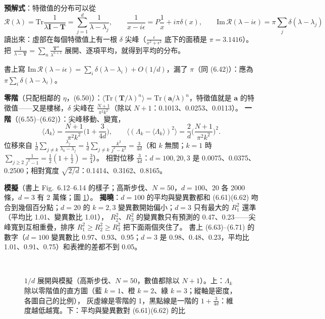 \textbf{預解式}：特徵值的分布可以從
\[\mathcal R(\lambda)=\mathrm{Tr}\frac{1}{\lambda\mathbf I-\mathbf T}=\sum_{j=1}^{d}\frac{1}{\lambda-\lambda_j},\qquad
\frac{1}{x-i\epsilon}=P\frac1x+i\pi\delta(x),\qquad \mathrm{Im}\,\mathcal R(\lambda-i\epsilon)=\pi\sum_j\delta(\lambda-\lambda_j)\tag{6.38--6.42}\]
讀出來：虛部在每個特徵值上有一根 $\delta$ 尖峰（$\frac{\epsilon}{x^2+\epsilon^2}$ 底下的面積是 $\pi=3.1416$）。把 $\frac1{\lambda-\mathbf T}=\sum_n\frac{\mathbf T^n}{\lambda^{n+1}}$ 展開、逐項平均，就得到平均的分布。
\begin{errbox}[p.~146，(6.52)]
書上寫 $\mathrm{Im}\,\mathcal R(\lambda-i\epsilon)=\sum_i\delta(\lambda-\lambda_i)+O(1/d)$，漏了 $\pi$（同 (6.42)）：應為 $\pi\sum_i\delta(\lambda-\lambda_i)$。
\end{errbox}
\textbf{零階}（只配相鄰的 $\eta$，(6.50)）：$\langle\mathrm{Tr}(\mathbf T/\lambda)^n\rangle=\mathrm{Tr}(\mathbf a/\lambda)^n$，特徵值就是 $\mathbf a$ 的特徵值——又是樓梯，$\delta$ 尖峰在
$\frac{N+1}{\pi^2k^2}$（除以 $N+1$：0.1013、0.0253、0.0113）。
\textbf{一階}（(6.55)--(6.62)）：尖峰移動、變寬，
\[\langle\Lambda_k\rangle=\frac{N+1}{\pi^2k^2}\Big(1+\frac{3}{4d}\Big),\qquad \big\langle(\Lambda_k-\langle\Lambda_k\rangle)^2\big\rangle=\frac2d\Big(\frac{N+1}{\pi^2k^2}\Big)^2.\tag{6.61, 6.62}\]
位移來自 $\frac1d\sum_{j\ne k}\frac{\lambda_j}{\lambda_k-\lambda_j}=\frac1d\sum_{j\ne k}\frac{k^2}{j^2-k^2}=\frac{3}{4d}$（和 $k$ 無關；$k=1$ 時 $\sum_{j\ge2}\frac1{j^2-1}=\frac12(1+\frac12)=\frac34$）。
相對位移 $\frac3{4d}$：$d=100,20,3$ 是 0.0075、0.0375、0.2500；相對寬度 $\sqrt{2/d}$：0.1414、0.3162、0.8165。

\textbf{模擬}（書上 Fig.~6.12--6.14 的樣子；高斯步伐、$N=50$，$d=100$、20 各 2000 條，$d=3$ 有 2 萬條；圖 \ref{six-fig-oned}）。
\textbf{揭曉}：$d=100$ 的平均與變異數都和 (6.61)(6.62) 吻合到幾個百分點；$d=20$ 的 $k=2,3$ 變異數開始偏小；$d=3$ 只有最大的 $R_1^2$ 還準（平均比 1.01、變異數比 1.01），
$R_2^2$、$R_3^2$ 的變異數只有預測的 0.47、0.23——尖峰寬到互相重疊，排序 $R_1^2\ge R_2^2\ge R_3^2$ 把下面兩個夾住了。
書上 (6.63)--(6.71) 的數字（$d=100$ 變異數比 0.97、0.93、0.95；$d=3$ 是 0.98、0.48、0.23，平均比 1.01、0.91、0.75）和表裡的差都不到 0.05。

\begin{figure}[htbp]
\centering
\SixFigOneDee\\[4pt]
{\footnotesize\SixTabOneDee}
\caption{$1/d$ 展開與模擬（高斯步伐、$N=50$，數值都除以 $N+1$）。上：$\Lambda_k$ 除以零階值的直方圖（藍 $k=1$、橙 $k=2$、綠 $k=3$；縱軸是密度，各圖自己的比例），
灰虛線是零階的 1，黑點線是一階的 $1+\frac3{4d}$：維度越低越寬。下：平均與變異數對 (6.61)(6.62) 的比}\label{six-fig-oned}
\end{figure}

